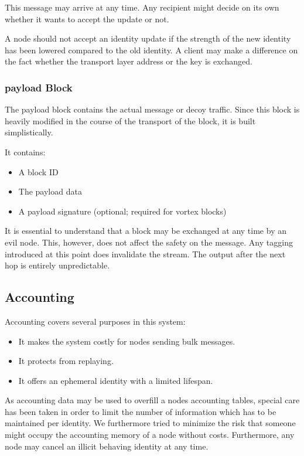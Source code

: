 \begin{itemize}
	This message may arrive at any time. Any recipient might decide on its own whether it wants to accept the update or not.
	
	A node should not accept an identity update if the strength of the new identity has been lowered compared to the old identity. A client may make a difference on the fact whether the transport layer address or the key is exchanged. 
\end{itemize}

\subsubsection{payload Block}
The payload block contains the actual message or decoy traffic. Since this block is heavily modified in the course of the transport of the block, it is built simplistically.

It contains:
\begin{itemize}
	\item A block ID
	\item The payload data
	\item A payload signature (optional; required for vortex blocks)
\end{itemize}

It is essential to understand that a block may be exchanged at any time by an evil node. This, however, does not affect the safety on the message. Any tagging introduced at this point does invalidate the stream. The output after the next hop is entirely unpredictable.

\subsection{Accounting\label{sec:accounting}}
Accounting covers several purposes in this system:
\begin{itemize}
	\item It makes the system costly for nodes sending bulk messages.
	\item It protects from replaying.
	\item It offers an ephemeral identity with a limited lifespan.
\end{itemize}

As accounting data may be used to overfill a nodes accounting tables, special care has been taken in order to limit the number of information which has to be maintained per identity. We furthermore tried to minimize the risk that someone might occupy the accounting memory of a node without costs. Furthermore, any node may cancel an illicit behaving identity at any time.


